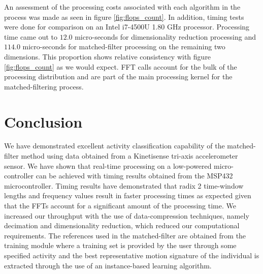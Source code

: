 \documentclass{sciposter}
\begin{document}
\begin{multicols}{3}
An assessment of the processing costs associated with each algorithm in the process was made as seen in figure \ref{fig:flops_count}.
In addition, timing tests were done for comparison on an Intel i7-4500U 1.80 GHz processor.
Processing time came out to $12.0$ micro-seconds for dimensionality reduction processing and $114.0$ micro-seconds for matched-filter processing on the remaining two dimensions.
This proportion shows relative consistency with figure \ref{fig:flops_count} as we would expect.
FFT calls account for the bulk of the processing distribution and are part of the main processing kernel for the matched-filtering process.

\section{Conclusion}
We have demonstrated excellent activity classification capability of the matched-filter method using data obtained from a Kinetisense tri-axis accelerometer sensor.
We have shown that real-time processing on a low-powered micro-controller can be achieved with timing results obtained from the MSP432 microcontroller.
Timing results have demonstrated that radix 2 time-window lengths and frequency values result in faster processing times as expected given that the FFTs account for a significant amount of the processing time.
We increased our throughput with the use of data-compression techniques, namely decimation and dimensionality reduction, which reduced our computational requirements.
The references used in the matched-filter are obtained from the training module where a training set is provided by the user through some specified activity and the best representative motion signature of the individual is extracted through the use of an instance-based learning algorithm.




\end{multicols}
\end{document}
